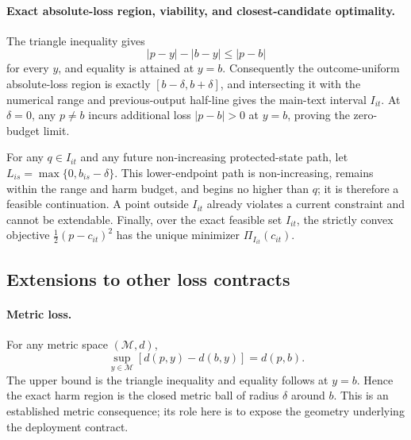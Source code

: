 \documentclass[11pt]{article}
\begin{document}
\paragraph{Exact absolute-loss region, viability, and closest-candidate optimality.}
The triangle inequality gives
\[
 |p-y|-|b-y|\leq|p-b|
\]
for every \(y\), and equality is attained at \(y=b\). Consequently the outcome-uniform absolute-loss region is exactly \([b-\delta,b+\delta]\), and intersecting it with the numerical range and previous-output half-line gives the main-text interval \(I_{it}\). At \(\delta=0\), any \(p\neq b\) incurs additional loss \(|p-b|>0\) at \(y=b\), proving the zero-budget limit.

For any \(q\in I_{it}\) and any future non-increasing protected-state path, let \(L_{is}=\max\{0,b_{is}-\delta\}\). This lower-endpoint path is non-increasing, remains within the range and harm budget, and begins no higher than \(q\); it is therefore a feasible continuation. A point outside \(I_{it}\) already violates a current constraint and cannot be extendable. Finally, over the exact feasible set \(I_{it}\), the strictly convex objective \(\tfrac12(p-c_{it})^2\) has the unique minimizer \(\Pi_{I_{it}}(c_{it})\).

\subsection{Extensions to other loss contracts}

\paragraph{Metric loss.}
For any metric space \((\mathcal M,d)\),
\begin{equation}
 \sup_{y\in\mathcal M}[d(p,y)-d(b,y)]=d(p,b).
 \label{eq:supp_metric_identity}
\end{equation}
The upper bound is the triangle inequality and equality follows at \(y=b\). Hence the exact harm region is the closed metric ball of radius \(\delta\) around \(b\). This is an established metric consequence; its role here is to expose the geometry underlying the deployment contract.
\end{document}
